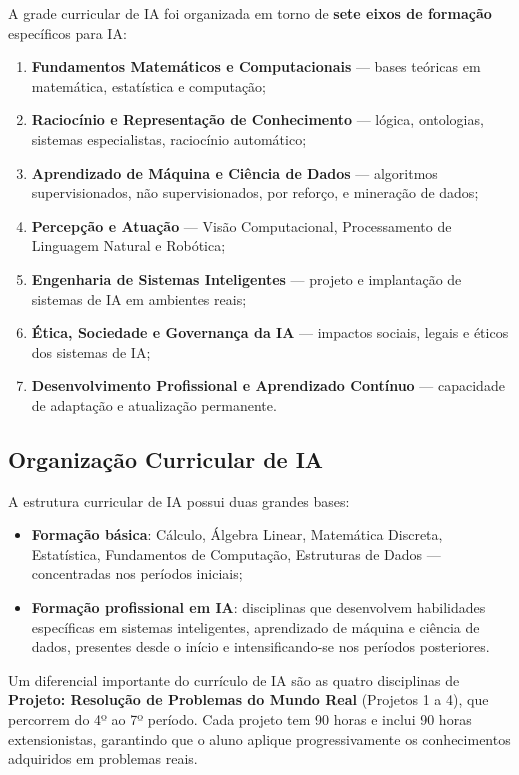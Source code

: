 \documentclass[9pt,a4paper]{extarticle}
\newcommand{\ntc}[1]{\textcolor{notice}{#1}}
\begin{document}
A grade curricular de IA foi organizada em torno de \textbf{sete eixos de formação} específicos para IA:

\begin{enumerate}
  \item \textbf{Fundamentos Matemáticos e Computacionais} --- bases teóricas em matemática, estatística e computação;
  \item \textbf{Raciocínio e Representação de Conhecimento} --- lógica, ontologias, sistemas especialistas, raciocínio automático;
  \item \textbf{Aprendizado de Máquina e Ciência de Dados} --- algoritmos supervisionados, não supervisionados, por reforço, e mineração de dados;
  \item \textbf{Percepção e Atuação} --- Visão Computacional, Processamento de Linguagem Natural e Robótica;
  \item \textbf{Engenharia de Sistemas Inteligentes} --- projeto e implantação de sistemas de IA em ambientes reais;
  \item \textbf{Ética, Sociedade e Governança da IA} --- impactos sociais, legais e éticos dos sistemas de IA;
  \item \textbf{Desenvolvimento Profissional e Aprendizado Contínuo} --- capacidade de adaptação e atualização permanente.
\end{enumerate}

\subsection{Organização Curricular de IA}

A estrutura curricular de IA possui duas grandes bases:

\begin{itemize}
  \item \textbf{Formação básica}: Cálculo, Álgebra Linear, Matemática Discreta, Estatística, Fundamentos de Computação, Estruturas de Dados --- concentradas nos períodos iniciais;
  \item \textbf{Formação profissional em IA}: disciplinas que desenvolvem habilidades específicas em sistemas inteligentes, aprendizado de máquina e ciência de dados, presentes desde o início e intensificando-se nos períodos posteriores.
\end{itemize}

\ntc{Um diferencial importante do currículo de IA são as quatro disciplinas de \textbf{Projeto: Resolução de Problemas do Mundo Real} (Projetos 1 a 4), que percorrem do 4º ao 7º período. Cada projeto tem 90 horas e inclui 90 horas extensionistas, garantindo que o aluno aplique progressivamente os conhecimentos adquiridos em problemas reais.}
\end{document}
